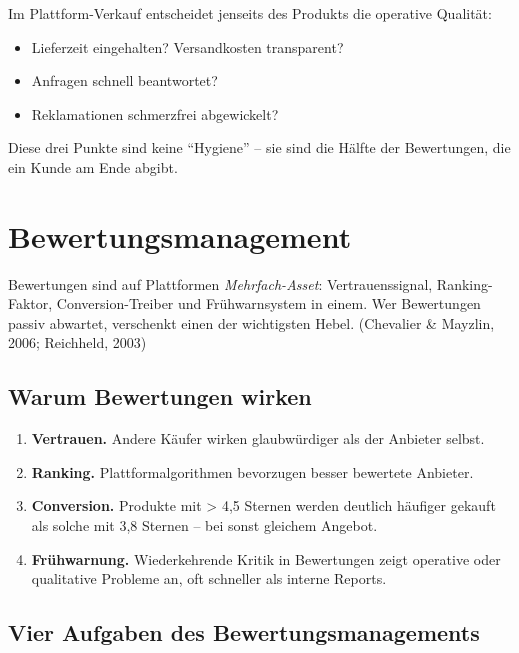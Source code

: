 \documentclass[11pt,a4paper,oneside]{article}
\newcommand{\quelle}[1]{{\footnotesize\color{lpGray}(#1)}}
\begin{document}
Im Plattform-Verkauf entscheidet jenseits des Produkts die operative Qualität:

\begin{itemize}
  \item Lieferzeit eingehalten? Versandkosten transparent?
  \item Anfragen schnell beantwortet?
  \item Reklamationen schmerzfrei abgewickelt?
\end{itemize}

Diese drei Punkte sind keine ``Hygiene'' -- sie sind die Hälfte der Bewertungen, die ein Kunde am Ende abgibt.

\section{Bewertungsmanagement}

Bewertungen sind auf Plattformen \emph{Mehrfach-Asset}: Vertrauenssignal, Ranking-Faktor, Conversion-Treiber und Frühwarnsystem in einem. Wer Bewertungen passiv abwartet, verschenkt einen der wichtigsten Hebel. \quelle{Chevalier \& Mayzlin, 2006; Reichheld, 2003}

\subsection{Warum Bewertungen wirken}

\begin{enumerate}
  \item \textbf{Vertrauen.} Andere Käufer wirken glaubwürdiger als der Anbieter selbst.
  \item \textbf{Ranking.} Plattformalgorithmen bevorzugen besser bewertete Anbieter.
  \item \textbf{Conversion.} Produkte mit > 4{,}5 Sternen werden deutlich häufiger gekauft als solche mit 3{,}8 Sternen -- bei sonst gleichem Angebot.
  \item \textbf{Frühwarnung.} Wiederkehrende Kritik in Bewertungen zeigt operative oder qualitative Probleme an, oft schneller als interne Reports.
\end{enumerate}

\subsection{Vier Aufgaben des Bewertungsmanagements}
\end{document}
